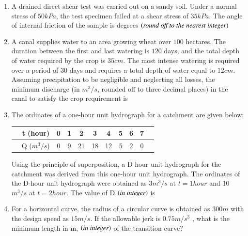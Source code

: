 \documentclass{exam}
\begin{document}
\begin{enumerate}
\item A drained direct shear test was carried out on a sandy soil. Under a normal stress of $50kPa$, the test specimen failed at a shear stress of $35kPa$. The angle of internal friction of the sample is \underline{\hspace{2cm}} degrees $\left(\textit{round off to the nearest integer}\right)$
\vspace{0.5cm}

\item A canal supplies water to an area growing wheat over $100$ hectares. The duration between the first and last watering is $120$ days, and the total depth of water required by the crop is $35 cm$. The most intense watering is required over a period of $30$ days and requires a total depth of water equal to $12 cm$. Assuming precipitation to be negligible and neglecting all losses, the minimum discharge (in $m^3/s$, rounded off to three decimal places) in the canal to satisfy the crop requirement is \underline{\hspace{3cm}}
\vspace{0.5cm}

\item The ordinates of a one-hour unit hydrograph for a catchment are given below:\\
\vspace{0.25cm}
\begin{table}[h!]
    \centering
    \begin{tabular}{c|c|c|c|c|c|c|c|c|c|c}
    \hline
     & t (hour) & 0 & 1 & 2 & 3 & 4 & 5 & 6 & 7 &   \\
    \hline
     & Q ($m^3/s$) & 0 & 9 & 21 & 18 & 12 & 5 & 2 & 0 & \\
    \hline
    \end{tabular}
\end{table}
Using the principle of superposition, a D-hour unit hydrograph for the catchment was derived from this one-hour unit hydrograph. The ordinates of the D-hour unit hydrograph were obtained as $3 m^3/s$ at $t = 1 hour$ and 10 $m^3/s$ at $t = 2 hour$. The value of D $\left(\textit{in integer}\right)$ is \underline{\hspace{3cm}}
\vspace{0.5cm}

\item For a horizontal curve, the radius of a circular curve is obtained as $300 m$ with the design speed as $15 m/s$. If the allowable jerk is $0.75 m/s^3$ , what is the minimum length in m, $\left(\textit{in integer}\right)$ of the transition curve? \underline{\hspace{3cm}}


\end{enumerate}
\end{document}
